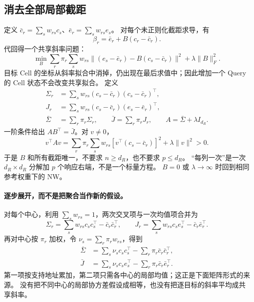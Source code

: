 \documentclass[11pt,UTF8,fontset=fandol]{ctexart}
\numberwithin{equation}{section}
\theoremstyle{definition}
\begin{document}
\subsection{消去全部局部截距}
定义 $\bar c_r=\sum_s w_{rs}c_s$、$\bar e_r=\sum_s w_{rs}e_s$。
对每个未正则化截距求导，有
\begin{equation}
 \beta_r=\bar e_r+B(c_r-\bar c_r).
 \label{v51:eq:intercept-elimination}
\end{equation}
代回得一个共享斜率问题：
\begin{equation}
 \min_B\sum_r\pi_r\sum_s w_{rs}
 \|(e_s-\bar e_r)-B(c_s-\bar c_r)\|^2+\lambda\|B\|_F^2.
 \label{v51:eq:shared-centered}
\end{equation}
目标 Cell 的坐标从斜率拟合中消掉，仍出现在最后求值中；因此增加一个 Query 的 Cell 状态不会改变共享拟合。
定义
\begin{equation}
 \begin{aligned}
 \Sigma_r&=\sum_s w_{rs}(c_s-\bar c_r)(c_s-\bar c_r)^\top,\\
 J_r&=\sum_s w_{rs}(c_s-\bar c_r)(e_s-\bar e_r)^\top,\\
 \bar\Sigma&=\sum_r\pi_r\Sigma_r,\qquad \bar J=\sum_r\pi_rJ_r,\qquad
 A=\bar\Sigma+\lambda I_{d_R}.
 \end{aligned}
 \label{v51:eq:aggregate-moments}
\end{equation}
一阶条件给出 $AB^\top=\bar J$。对 $v\ne0$，
\begin{equation}
 v^\top Av=\sum_r\pi_r\sum_s w_{rs}[v^\top(c_s-\bar c_r)]^2+\lambda\|v\|^2>0.
 \label{v51:eq:shared-spd}
\end{equation}
于是 $B$ 和所有截距唯一，不要求 $n\ge d_R$，也不要求 $p\le d_R$。
“每列一次”是一次 $d_R\times d_R$ 分解加 $p$ 个响应右端，不是一个标量方程。
$B=0$ 或 $\lambda\to\infty$ 时回到相同参考权重下的 NW。


\paragraph{逐步展开，而不是把聚合当作新的假设。}
对每个中心，利用 $\sum_s w_{rs}=1$，两次交叉项与一次均值项合并为
\begin{equation}
 \Sigma_r=\sum_s w_{rs}c_sc_s^\top-\bar c_r\bar c_r^\top,\qquad
 J_r=\sum_s w_{rs}c_se_s^\top-\bar c_r\bar e_r^\top.
 \label{v53:eq:expanded-local-moments}
\end{equation}
再对中心按 $\pi_r$ 加权，令 $\nu_s=\sum_r\pi_rw_{rs}$，得到
\begin{equation}
 \begin{aligned}
 \bar\Sigma&=\sum_s\nu_sc_sc_s^\top-\sum_r\pi_r\bar c_r\bar c_r^\top,\\
 \bar J&=\sum_s\nu_sc_se_s^\top-\sum_r\pi_r\bar c_r\bar e_r^\top.
 \end{aligned}
 \label{v53:eq:expanded-global-moments}
\end{equation}
第一项按支持地址累加，第二项只需各中心的局部均值；这正是下面矩阵形式的来源。
没有把不同中心的局部协方差假设成相等，也没有把逐目标的斜率平均成共享斜率。
\end{document}
